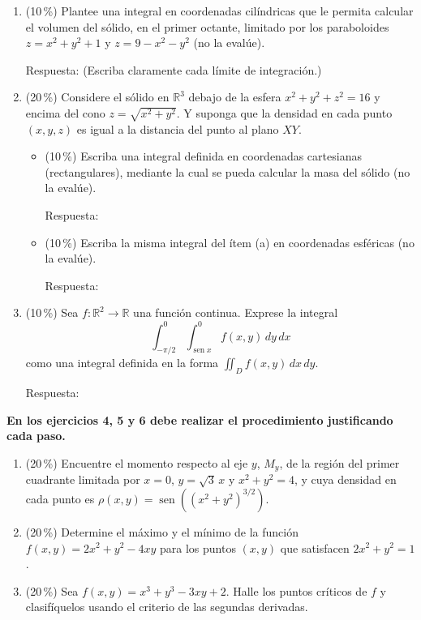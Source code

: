 \documentclass[11pt]{article}
\begin{document}
\begin{enumerate}
\item{} (10\,\%) Plantee una integral en coordenadas cilíndricas que le permita calcular el volumen del sólido, en el primer octante, limitado por los paraboloides $z = x^2 + y^2 + 1$ y $z = 9 - x^2 - y^2$ (no la evalúe).

\vspace{2pt}
\noindent Respuesta: \underline{\phantom{XXXXXXXXXXXXXXXX}}\quad (Escriba claramente cada límite de integración.)

\item{} (20\,\%) Considere el sólido en $\mathbb{R}^3$ debajo de la esfera $x^2 + y^2 + z^2 = 16$ y encima del cono $z = \sqrt{x^2+y^2}$. Y suponga que la densidad en cada punto $(x,y,z)$ es igual a la distancia del punto al plano $XY$.
\begin{itemize}
\item[(a)] (10\,\%) Escriba una integral definida en coordenadas cartesianas (rectangulares), mediante la cual se pueda calcular la masa del sólido (no la evalúe).

\vspace{2pt}
\noindent Respuesta: \underline{\phantom{XXXXXXXXXXXXXXXX}}
\item[(b)] (10\,\%) Escriba la misma integral del ítem (a) en coordenadas esféricas (no la evalúe).

\vspace{2pt}
\noindent Respuesta: \underline{\phantom{XXXXXXXXXXXXXXXX}}
\end{itemize}

\item{} (10\,\%) Sea $f: \mathbb{R}^2 \to \mathbb{R}$ una función continua. Exprese la integral
\[
\int_{-\pi/2}^0 \int_{\operatorname{sen} x}^0 f(x,y)\,dy\,dx
\]
como una integral definida en la forma $\displaystyle\iint_D f(x,y)\,dx\,dy$.

\vspace{2pt}
\noindent Respuesta: \underline{\phantom{XXXXXXXXXXXXXXXX}}
\end{enumerate}

\vspace{4pt}
\noindent\textbf{En los ejercicios 4, 5 y 6 debe realizar el procedimiento justificando cada paso.}

\begin{enumerate}[start=4]
\item{} (20\,\%) Encuentre el momento respecto al eje $y$, $M_y$, de la región del primer cuadrante limitada por $x = 0$, $y = \sqrt3\,x$ y $x^2 + y^2 = 4$, y cuya densidad en cada punto es $\rho(x,y) = \operatorname{sen}\!\left((x^2+y^2)^{3/2}\right)$.

\item{} (20\,\%) Determine el máximo y el mínimo de la función $f(x,y) = 2x^2 + y^2 - 4xy$ para los puntos $(x,y)$ que satisfacen $2x^2 + y^2 = 1$.

\item{} (20\,\%) Sea $f(x,y) = x^3 + y^3 - 3xy + 2$. Halle los puntos críticos de $f$ y clasifíquelos usando el criterio de las segundas derivadas.
\end{enumerate}

\examfooter
\end{document}
